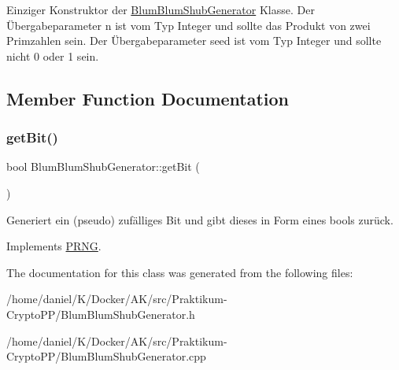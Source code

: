 Einziger Konstruktor der \hyperlink{classBlumBlumShubGenerator}{Blum\+Blum\+Shub\+Generator} Klasse. Der Übergabeparameter n ist vom Typ Integer und sollte das Produkt von zwei Primzahlen sein. Der Übergabeparameter seed ist vom Typ Integer und sollte nicht 0 oder 1 sein. 

\subsection{Member Function Documentation}
\mbox{\label{classBlumBlumShubGenerator_aa25d1b6bc4686e6fecd254877b472d39}} 
\subsubsection{\texorpdfstring{get\+Bit()}{getBit()}}
{\footnotesize\ttfamily bool Blum\+Blum\+Shub\+Generator\+::get\+Bit (\begin{DoxyParamCaption}{ }\end{DoxyParamCaption})\hspace{0.3cm}{\ttfamily [virtual]}}

Generiert ein (pseudo) zufälliges Bit und gibt dieses in Form eines bools zurück. 

Implements \hyperlink{classPRNG_a513ec082275e805da358a2a790db2f9e}{P\+R\+NG}.



The documentation for this class was generated from the following files\+:\begin{DoxyCompactItemize}
\item 
/home/daniel/\+K/\+Docker/\+A\+K/src/\+Praktikum-\/\+Crypto\+P\+P/Blum\+Blum\+Shub\+Generator.\+h\item 
/home/daniel/\+K/\+Docker/\+A\+K/src/\+Praktikum-\/\+Crypto\+P\+P/Blum\+Blum\+Shub\+Generator.\+cpp\end{DoxyCompactItemize}

